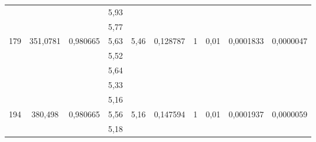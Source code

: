 \documentclass[a4paper, 12pt]{article}
\begin{document}
\begin{table}[h!]
\begin{tabular}{|c|c|c|c|c|c|c|c|c|c|}
                     &                           &                           & 5,93           &                           &                                    &                    &                         &                            &                               \\ \cline{4-4}
                     &                           &                           & 5,77           &                           &                                    &                    &                         &                            &                               \\ \hline
\multirow{5}{*}{179} & \multirow{5}{*}{351,0781} & \multirow{5}{*}{0,980665} & 5,63           & \multirow{5}{*}{5,46}     & \multirow{5}{*}{0,128787}          & \multirow{5}{*}{1} & \multirow{5}{*}{0,01}   & \multirow{5}{*}{0,0001833} & \multirow{5}{*}{0,0000047}    \\ \cline{4-4}
                     &                           &                           & 5,52           &                           &                                    &                    &                         &                            &                               \\ \cline{4-4}
                     &                           &                           & 5,64           &                           &                                    &                    &                         &                            &                               \\ \cline{4-4}
                     &                           &                           & 5,33           &                           &                                    &                    &                         &                            &                               \\ \cline{4-4}
                     &                           &                           & 5,16           &                           &                                    &                    &                         &                            &                               \\ \hline
\multirow{5}{*}{194} & \multirow{5}{*}{380,498}  & \multirow{5}{*}{0,980665} & 5,56           & \multirow{5}{*}{5,16}     & \multirow{5}{*}{0,147594}          & \multirow{5}{*}{1} & \multirow{5}{*}{0,01}   & \multirow{5}{*}{0,0001937} & \multirow{5}{*}{0,0000059}    \\ \cline{4-4}
                     &                           &                           & 5,18           &                           &                                    &                    &                         &                            &                               \\ \cline{4-4}

\end{tabular}
\end{table}
\end{document}
